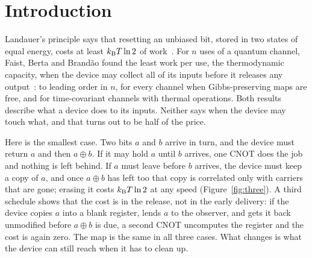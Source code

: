 \section{Introduction}\label{sec:intro}

Landauer's principle says that resetting an unbiased bit, stored in two states of equal energy, costs at least $k_{\mathrm B} T\ln2$ of work~\cite{Landauer61}. For $n$ uses of a quantum channel, Faist, Berta and Brand\~ao found the least work per use, the thermodynamic capacity, when the device may collect all of its inputs before it releases any output~\cite{FBB19,FBB21}: to leading order in $n$, for every channel when Gibbs-preserving maps are free, and for time-covariant channels with thermal operations. Both results describe what a device does to its inputs. Neither says when the device may touch what, and that turns out to be half of the price.

Here is the smallest case. Two bits $a$ and $b$ arrive in turn, and the device must return $a$ and then $a\oplus b$. If it may hold $a$ until $b$ arrives, one CNOT does the job and nothing is left behind. If $a$ must leave before $b$ arrives, the device must keep a copy of $a$, and once $a\oplus b$ has left too that copy is correlated only with carriers that are gone; erasing it costs $k_{\mathrm B} T\ln2$ at any speed (Figure~\ref{fig:three}). A third schedule shows that the cost is in the release, not in the early delivery: if the device copies $a$ into a blank register, lends $a$ to the observer, and gets it back unmodified before $a\oplus b$ is due, a second CNOT uncomputes the register and the cost is again zero. The map is the same in all three cases. What changes is what the device can still reach when it has to clean up.


